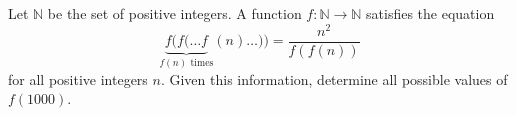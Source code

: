 Let $\mathbb{N}$ be the set of positive integers. A function $f:\mathbb{N}\to\mathbb{N}$ satisfies the equation \[\underbrace{f(f(\ldots f}_{f(n)\text{ times}}(n)\ldots))=\frac{n^2}{f(f(n))}\] for all positive integers $n$. Given this information, determine all possible values of $f(1000)$.